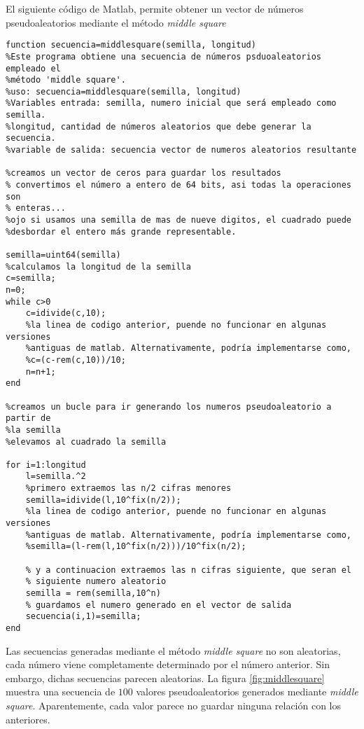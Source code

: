 El siguiente código de Matlab, permite obtener un vector de números pseudoaleatorios mediante el método \emph{middle square}

\begin{verbatim}
function secuencia=middlesquare(semilla, longitud)
%Este programa obtiene una secuencia de números psduoaleatorios empleado el
%método 'middle square'.
%uso: secuencia=middlesquare(semilla, longitud)
%Variables entrada: semilla, numero inicial que será empleado como semilla.
%longitud, cantidad de números aleatorios que debe generar la secuencia.
%variable de salida: secuencia vector de numeros aleatorios resultante

%creamos un vector de ceros para guardar los resultados
% convertimos el número a entero de 64 bits, asi todas la operaciones son
% enteras...
%ojo si usamos una semilla de mas de nueve digitos, el cuadrado puede
%desbordar el entero más grande representable.

semilla=uint64(semilla)
%calculamos la longitud de la semilla
c=semilla;
n=0;
while c>0
    c=idivide(c,10);
    %la linea de codigo anterior, puende no funcionar en algunas versiones
    %antiguas de matlab. Alternativamente, podría implementarse como,
    %c=(c-rem(c,10))/10;
    n=n+1;
end

%creamos un bucle para ir generando los numeros pseudoaleatorio a partir de
%la semilla
%elevamos al cuadrado la semilla
    
for i=1:longitud     
    l=semilla.^2
    %primero extraemos las n/2 cifras menores
    semilla=idivide(l,10^fix(n/2));
    %la linea de codigo anterior, puende no funcionar en algunas versiones
    %antiguas de matlab. Alternativamente, podría implementarse como,
    %semilla=(l-rem(l,10^fix(n/2)))/10^fix(n/2);
   
    % y a continuacion extraemos las n cifras siguiente, que seran el
    % siguiente numero aleatorio
    semilla = rem(semilla,10^n)
    % guardamos el numero generado en el vector de salida
    secuencia(i,1)=semilla;
end
\end{verbatim} 

Las secuencias generadas mediante el método \emph{middle square} no son aleatorias, cada número viene completamente determinado por el número anterior. Sin embargo, dichas secuencias parecen aleatorias. La figura \ref{fig:middlesquare} muestra una secuencia de $100$ valores pseudoaleatorios generados mediante \emph{middle square}. Aparentemente, cada valor parece no guardar ninguna relación con los anteriores.

